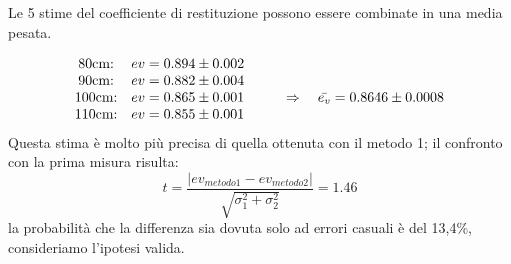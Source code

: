 \documentclass[a4paper]{article}
\theoremstyle{definition}
\begin{document}
	\noindent Le 5 stime del coefficiente di restituzione possono essere combinate in una media pesata.
	
	\[\begin{matrix}
		$80cm:$ & $\(ev = 0.894 \pm 0.002\)$ &  \\ 
		$90cm:$ & $\(ev = 0.882 \pm 0.004\)$ &  \\ 
		$100cm:$ & $\(ev = 0.865 \pm 0.001\)$ & $\(\qquad \Rightarrow \quad \bar{e_{v}} = 0.8646 \pm 0.0008\)$\\ 
		$110cm:$ & $\(ev = 0.855 \pm 0.001\)$ &  
	\end{matrix}\]
\noindent Questa stima è molto più precisa di quella ottenuta con il metodo 1; il confronto con la prima misura risulta:
	\[t = \frac{ \left |ev_{metodo1}  - ev_{metodo2} \right |}{\sqrt{\sigma_{1}^{2}+ \sigma_{2}^{2}}} =  1.46 \]
	\noindent la probabilità che la differenza sia dovuta solo ad errori casuali è del 13,4\(\%\), consideriamo l'ipotesi valida.\\\\\\\\\\\\\\\\\\\\\\\\\\
	
\end{document}
